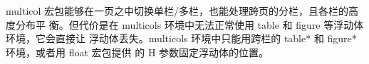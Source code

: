 \documentclass[12pt]{ctexrep}
\begin{document}





\begin{multicols}{3}
    multicol 宏包能够在一页之中切换单栏/多栏，也能处理跨页的分栏，且各栏的高度分布平
衡。但代价是在 multicols 环境中无法正常使用 table 和 figure 等浮动体环境，它会直接让
浮动体丢失。multicols 环境中只能用跨栏的 table* 和 figure* 环境，或者用 float 宏包提供
的 H 参数固定浮动体的位置。
\end{multicols}


\end{document}
